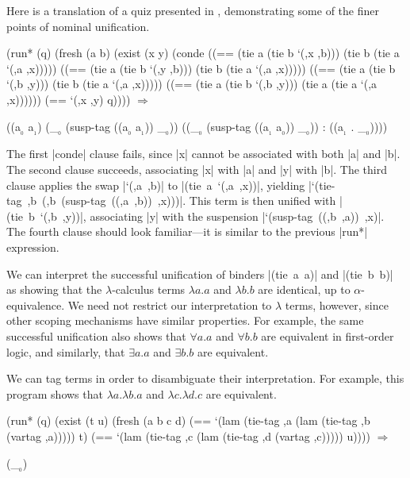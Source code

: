 Here is a translation of a quiz presented in \citet{Urban-Pitts-Gabbay/04}, 
demonstrating some of the finer points of nominal unification.

\schemedisplayspace
\begin{schemedisplay}
(run* (q)
  (fresh (a b)
    (exist (x y)
      (conde
        ((== (tie a (tie b `(,x ,b))) (tie b (tie a `(,a ,x)))))
        ((== (tie a (tie b `(,y ,b))) (tie b (tie a `(,a ,x)))))
        ((== (tie a (tie b `(,b ,y))) (tie b (tie a `(,a ,x)))))
        ((== (tie a (tie b `(,b ,y))) (tie a (tie a `(,a ,x))))))
      (== `(,x ,y) q)))) $\Rightarrow$
\end{schemedisplay}
\nspace
\begin{schemeresponse}
((a$_{_{0}}$ a$_{_{1}}$)
 (_$_{_{0}}$ (susp-tag ((a$_{_{0}}$ a$_{_{1}}$)) _$_{_{0}}$))
 ((_$_{_{0}}$ (susp-tag ((a$_{_{1}}$ a$_{_{0}}$)) _$_{_{0}}$)) : ((a$_{_{1}}$ . _$_{_{0}}$))))
\end{schemeresponse}
The first \scheme|conde| clause fails, since \scheme|x| cannot 
be associated with both \scheme|a| and \scheme|b|.  
The second clause succeeds, associating \scheme|x| with \scheme|a| and \scheme|y|
with \scheme|b|.  The third clause applies the swap \mbox{\scheme|`(,a ,b)|}
to \mbox{\scheme|(tie a `(,a ,x))|}, yielding
\mbox{\scheme|`(tie-tag ,b (,b (susp-tag ((,a ,b)) ,x)))|}.  This term is
then unified with \mbox{\scheme|(tie b `(,b ,y))|}, 
associating \scheme|y| with the suspension
\mbox{\scheme|`(susp-tag ((,b ,a)) ,x)|}.
The fourth clause should look familiar---it is similar 
to the previous \scheme|run*| expression.

We can interpret the successful unification of binders
\mbox{\scheme|(tie a a)|} and \mbox{\scheme|(tie b b)|} 
as showing that the $\lambda$-calculus
terms $\lambda a.a$ and $\lambda b.b$ are identical, up to
$\alpha$-equivalence. We need not restrict our interpretation to
$\lambda$ terms, however, since other scoping mechanisms have similar
properties. For example, the same successful unification also shows that $\forall a . a$
and $\forall b . b$ are equivalent in first-order logic, and
similarly, that $\exists a . a$ and $\exists b . b$ are equivalent.

We can tag terms in order to disambiguate their interpretation.  For example, this program shows that $\lambda a . \lambda b . a$ and $\lambda c . \lambda d . c$ are equivalent.

\schemedisplayspace
\begin{schemedisplay}
(run* (q)
  (exist (t u)
    (fresh (a b c d)
      (== `(lam (tie-tag ,a (lam (tie-tag ,b (vartag ,a))))) t)
      (== `(lam (tie-tag ,c (lam (tie-tag ,d (vartag ,c))))) u)))) $\Rightarrow$
\end{schemedisplay}
\nspace
\begin{schemeresponse}
(_$_{_{0}}$)
\end{schemeresponse}

